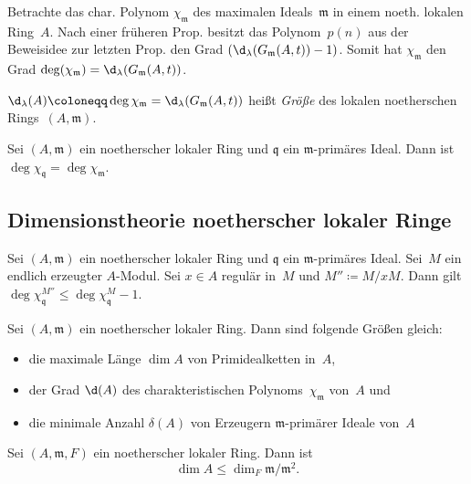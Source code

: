 \documentclass{cheat-sheet}
\newcommand{\qqq}{\mathfrak{q}}
\newcommand{\mmm}{\mathfrak{m}}
\begin{document}
\begin{bem}
  Betrachte das char. Polynom $\chi_\mmm$ des maximalen Ideals~$\mmm$ in einem noeth. lokalen Ring~$A$.
  Nach einer früheren Prop. besitzt das Polynom~$p(n)$ aus der Beweisidee zur letzten Prop. den Grad $(\d_\lambda(G_\mmm(A, t)) - 1)$.
  Somit hat $\chi_\mmm$ den Grad $\deg(\chi_\mmm) = \d_\lambda(G_\mmm(A, t))$.
\end{bem}

\begin{defn}
  $\d_\lambda(A) \coloneqq \deg \chi_\mmm = \d_\lambda(G_\mmm(A, t))$ heißt \emph{Größe} des lokalen noetherschen Rings~$(A, \mmm)$.
\end{defn}

\begin{prop}
  Sei $(A, \mmm)$ ein noetherscher lokaler Ring und $\qqq$ ein $\mmm$-primäres Ideal.
  Dann ist $\deg \chi_\qqq = \deg \chi_\mmm$.
\end{prop}

\subsection{Dimensionstheorie noetherscher lokaler Ringe}


\begin{prop}
  Sei $(A, \mmm)$ ein noetherscher lokaler Ring und $\qqq$ ein $\mmm$-primäres Ideal.
  Sei~$M$ ein endlich erzeugter $A$-Modul.
  Sei $x \in A$ regulär in~$M$ und $M'' \coloneqq M/xM$.
  Dann gilt $\deg \chi_\qqq^{M''} \leq \deg \chi_\qqq^M - 1$.
\end{prop}


\begin{satz}
  Sei $(A, \mmm)$ ein noetherscher lokaler Ring.
  Dann sind folgende Größen gleich:
  \begin{itemize}
    \item die maximale Länge $\dim A$ von Primidealketten in~$A$,
    \item der Grad $\d(A)$ des charakteristischen Polynoms~$\chi_\mmm$ von~$A$ und
    \item die minimale Anzahl $\delta(A)$ von Erzeugern $\mmm$-primärer Ideale von~$A$
  \end{itemize}
\end{satz}

\begin{kor}
  Sei $(A, \mmm, F)$ ein noetherscher lokaler Ring.
  Dann ist
  \[
    \dim A \leq \dim_F \mmm/\mmm^2.
  \]
\end{kor}
\end{document}
